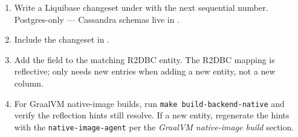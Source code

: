 \begin{enumerate}
  \item Write a Liquibase changeset under
         with the
        next sequential number. Postgres-only — Cassandra schemas live
        in .
  \item Include the changeset in .
  \item Add the field to the matching R2DBC entity. The R2DBC mapping
        is reflective;  only needs new
        entries when adding a new entity, not a new column.
  \item For GraalVM native-image builds, run \texttt{make
        build-backend-native} and verify the reflection hints still
        resolve. If a new entity, regenerate the hints with the
        \texttt{native-image-agent} per the
         \emph{GraalVM native-image build} section.
\end{enumerate}
